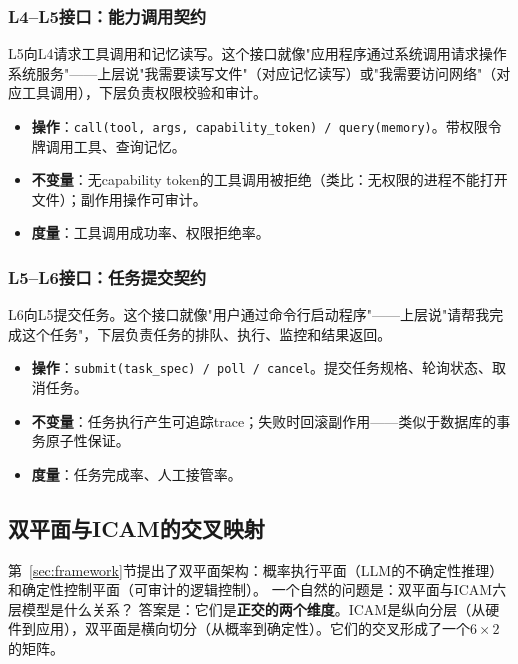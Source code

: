 \subsubsection{L4--L5接口：能力调用契约}

L5向L4请求工具调用和记忆读写。这个接口就像"应用程序通过系统调用请求操作系统服务"——上层说"我需要读写文件"（对应记忆读写）或"我需要访问网络"（对应工具调用），下层负责权限校验和审计。

\begin{itemize}[nosep]
\item \textbf{操作}：\texttt{call(tool, args, capability\_token) / query(memory)}。带权限令牌调用工具、查询记忆。
\item \textbf{不变量}：无capability token的工具调用被拒绝（类比：无权限的进程不能打开文件）；副作用操作可审计\cite{debenedetti2025camel}。
\item \textbf{度量}：工具调用成功率、权限拒绝率。
\end{itemize}

\subsubsection{L5--L6接口：任务提交契约}

L6向L5提交任务。这个接口就像"用户通过命令行启动程序"——上层说"请帮我完成这个任务"，下层负责任务的排队、执行、监控和结果返回。

\begin{itemize}[nosep]
\item \textbf{操作}：\texttt{submit(task\_spec) / poll / cancel}。提交任务规格、轮询状态、取消任务。
\item \textbf{不变量}：任务执行产生可追踪trace；失败时回滚副作用——类似于数据库的事务原子性保证。
\item \textbf{度量}：任务完成率、人工接管率。
\end{itemize}

\subsection{双平面与ICAM的交叉映射}
\label{sec:dual-plane-icam}

第~\ref{sec:framework}节提出了双平面架构：概率执行平面（LLM的不确定性推理）和确定性控制平面（可审计的逻辑控制）。
一个自然的问题是：双平面与ICAM六层模型是什么关系？
答案是：它们是\textbf{正交的两个维度}。ICAM是纵向分层（从硬件到应用），双平面是横向切分（从概率到确定性）。它们的交叉形成了一个$6 \times 2$的矩阵。


